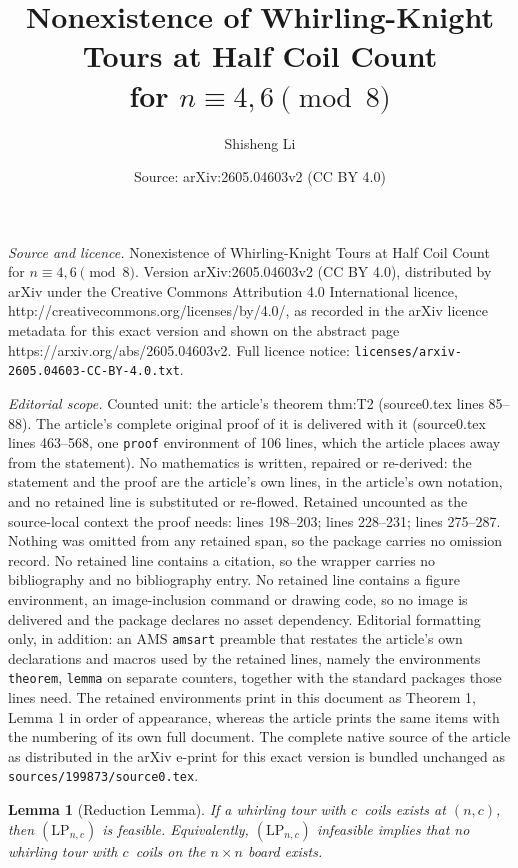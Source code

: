 \documentclass[10pt,a4paper]{amsart}
\title{Nonexistence of Whirling-Knight Tours at Half Coil Count\\ for $n\equiv 4,6\pmod 8$}
\author{Shisheng Li}
\date{Source: arXiv:2605.04603v2 (CC BY 4.0)}
\newtheorem{lemma}{Lemma}
\begin{document}
\maketitle

\noindent\emph{Source and licence.} Nonexistence of Whirling-Knight Tours at Half Coil Count\\ for $n\equiv 4,6\pmod 8$. Version arXiv:2605.04603v2 (CC BY 4.0), distributed by arXiv under the Creative Commons Attribution 4.0 International licence, http://creativecommons.org/licenses/by/4.0/, as recorded in the arXiv licence metadata for this exact version and shown on the abstract page https://arxiv.org/abs/2605.04603v2. Full licence notice: \texttt{licenses/arxiv-2605.04603-CC-BY-4.0.txt}.\par\smallskip

\noindent\textit{Editorial scope.} Counted unit: the article's theorem thm:T2 (source0.tex lines 85--88). The article's complete original proof of it is delivered with it (source0.tex lines 463--568, one \texttt{proof} environment of 106 lines, which the article places away from the statement). No mathematics is written, repaired or re-derived: the statement and the proof are the article's own lines, in the article's own notation, and no retained line is substituted or re-flowed.  Retained uncounted as the source-local context the proof needs: lines 198--203; lines 228--231; lines 275--287.  Nothing was omitted from any retained span, so the package carries no omission record.  No retained line contains a citation, so the wrapper carries no bibliography and no bibliography entry.  No retained line contains a figure environment, an image-inclusion command or drawing code, so no image is delivered and the package declares no asset dependency.  Editorial formatting only, in addition: an AMS \texttt{amsart} preamble that restates the article's own declarations and macros used by the retained lines, namely the environments \texttt{theorem}, \texttt{lemma} on separate counters, together with the standard packages those lines need.  The retained environments print in this document as Theorem 1, Lemma 1 in order of appearance, whereas the article prints the same items with the numbering of its own full document.  The complete native source of the article as distributed in the arXiv e-print for this exact version is bundled unchanged as \texttt{sources/199873/source0.tex}.
\begin{lemma}[Reduction Lemma]\label{lem:red}
If a whirling tour with $c$~coils exists at $(n,c)$, then
$(\mathrm{LP}_{n,c})$ is feasible.  Equivalently,
$(\mathrm{LP}_{n,c})$ infeasible implies that no whirling tour
with $c$~coils on the $n\times n$ board exists.
\end{lemma}
\end{document}
